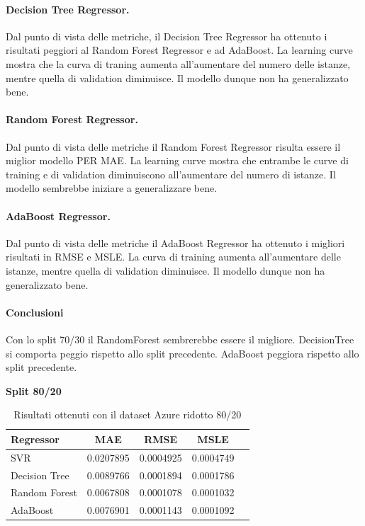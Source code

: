 \paragraph{\textbf{Decision Tree Regressor}.}
Dal punto di vista delle metriche, il Decision Tree Regressor ha ottenuto i risultati peggiori al Random Forest Regressor e ad AdaBoost.
La learning curve mostra che la curva di traning aumenta all'aumentare del numero delle istanze, mentre quella di validation diminuisce. Il modello dunque non ha generalizzato bene.
\paragraph{\textbf{Random Forest Regressor}.}
Dal punto di vista delle metriche il Random Forest Regressor risulta essere il miglior modello PER MAE.
La learning curve mostra che entrambe le curve di training e di validation diminuiscono all'aumentare del numero di istanze. Il modello sembrebbe iniziare a generalizzare bene.
\paragraph{\textbf{AdaBoost Regressor}.}
Dal punto di vista delle metriche il AdaBoost Regressor ha ottenuto i migliori risultati in RMSE e MSLE. La curva di training aumenta all'aumentare delle istanze, mentre quella di validation diminuisce. Il modello dunque non ha generalizzato bene.

\paragraph{\textbf{Conclusioni}} Con lo split 70/30 il RandomForest sembrerebbe essere il migliore. DecisionTree si comporta peggio rispetto allo split precedente. AdaBoost peggiora rispetto allo split precedente.

\newpage

\noindent\textbf{Split 80/20}


\begin{table}[H]
    \centering
    \begin{tabular}{|>{\centering\arraybackslash}m{5cm}|c|c|c|c|}
        \hline
        \textbf{Regressor} & \textbf{MAE} & \textbf{RMSE} & \textbf{MSLE} \\ [10pt]
        \hline
        SVR & 0.0207895 & 0.0004925 & 0.0004749 \\ [10pt]
        \hline
        Decision Tree & 0.0089766 & 0.0001894 & 0.0001786 \\ [10pt]
        \hline
        Random Forest & 0.0067808 & 0.0001078 & 0.0001032 \\ [10pt]
        \hline
        AdaBoost & 0.0076901 & 0.0001143 & 0.0001092 \\ [10pt]
        \hline
    \end{tabular}
    \caption{Risultati ottenuti con il dataset Azure ridotto 80/20}
    \label{tab:results}
\end{table}


